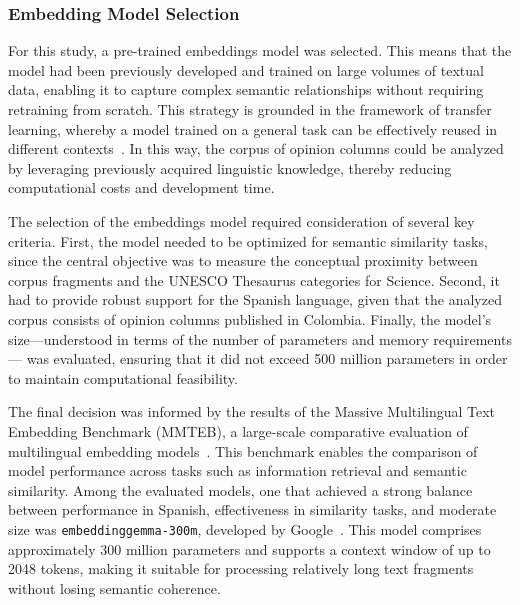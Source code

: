 \documentclass[pdflatex,sn-mathphys-num, iicol]{sn-jnl}
\begin{document}
	
	\subsubsection{Embedding Model Selection}\label{subsubsec:embedding}
	
	For this study, a pre-trained embeddings model was selected. This means that the model had been previously developed and trained on large volumes of textual data, enabling it to capture complex semantic relationships without requiring retraining from scratch. This strategy is grounded in the framework of transfer learning, whereby a model trained on a general task can be effectively reused in different contexts~\cite{Hosna2022}. In this way, the corpus of opinion columns could be analyzed by leveraging previously acquired linguistic knowledge, thereby reducing computational costs and development time.
	
	
	The selection of the embeddings model required consideration of several key criteria. First, the model needed to be optimized for semantic similarity tasks, since the central objective was to measure the conceptual proximity between corpus fragments and the UNESCO Thesaurus categories for Science. Second, it had to provide robust support for the Spanish language, given that the analyzed corpus consists of opinion columns published in Colombia. Finally, the model's size—understood in terms of the number of parameters and memory requirements— was evaluated, ensuring that it did not exceed 500 million parameters in order to maintain computational feasibility.

	
	The final decision was informed by the results of the Massive Multilingual Text Embedding Benchmark (MMTEB), a large-scale comparative evaluation of multilingual embedding models~\cite{enevoldsen2025mmtebmassivemultilingualtext}. This benchmark enables the comparison of model performance across tasks such as information retrieval and semantic similarity. Among the evaluated models, one that achieved a strong balance between performance in Spanish, effectiveness in similarity tasks, and moderate size was \texttt{embeddinggemma-300m}, developed by Google~\cite{vera2025embeddinggemmapowerfullightweighttext}. This model comprises approximately 300 million parameters and supports a context window of up to 2048 tokens, making it suitable for processing relatively long text fragments without losing semantic coherence.
	
\end{document}
